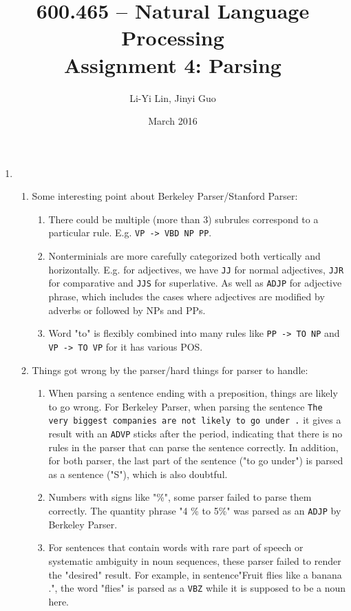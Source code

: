 \documentclass[10pt]{article}
\title{600.465 -- Natural Language Processing\\
Assignment 4: Parsing}
\author{Li-Yi Lin, Jinyi Guo}
\date{March 2016}
\begin{document}
\maketitle

\begin{enumerate}
    \item  %
    \begin{enumerate}
    	\item %
		Some interesting point about Berkeley Parser/Stanford Parser:
        \begin{enumerate}
			\item
        	There could be multiple (more than 3) subrules correspond to a particular rule. E.g. \texttt{VP -> VBD NP PP}.
            \item
            Nonterminials are more carefully categorized both vertically and horizontally. E.g. for adjectives, we have \texttt{JJ} for normal adjectives, \texttt{JJR} for comparative and \texttt{JJS} for superlative. As well as \texttt{ADJP} for adjective phrase, which includes the cases where adjectives are modified by adverbs or followed by NPs and PPs.
            \item
            Word "to" is flexibly combined into many rules like \texttt{PP -> TO NP} and \texttt{VP -> TO VP} for it has various POS.
            \end{enumerate}
        
        \item %
        Things got wrong by the parser/hard things for parser to handle:
        \begin{enumerate}
			\item
			When parsing a sentence ending with a preposition, things are likely to go wrong. For Berkeley Parser, when parsing the sentence \texttt{The very biggest companies are not likely to go under .} it gives a result with an \texttt{ADVP} sticks after the period, indicating that there is no rules in the parser that can parse the sentence correctly. In addition, for both parser, the last part of the sentence ("to go under") is parsed as a sentence ("S"), which is also doubtful.

            \item 
            Numbers with signs like "\%", some parser failed to parse them correctly. The quantity phrase "4 \% to 5\%" was parsed as an \texttt{ADJP} by Berkeley Parser.
            
            \item
            For sentences that contain words with rare part of speech or systematic ambiguity in noun sequences, these parser failed to render the "desired" result. For example, in sentence"Fruit flies like a banana .", the word "flies" is parsed as a \texttt{VBZ} while it is supposed to be a noun here.
            

\end{enumerate}
\end{enumerate}
\end{enumerate}
\end{document}
